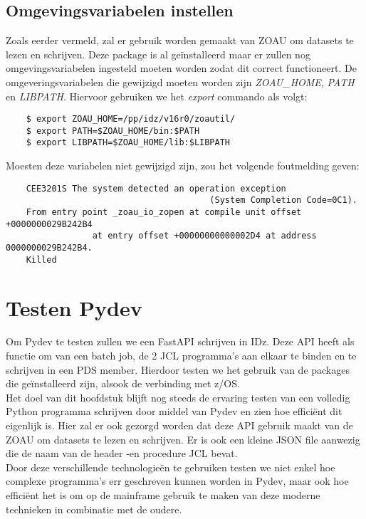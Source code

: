 \section{Omgevingsvariabelen instellen}
Zoals eerder vermeld, zal er gebruik worden gemaakt van ZOAU om datasets te lezen en schrijven. Deze package is al geïnstalleerd maar er zullen nog omgevingsvariabelen ingesteld moeten worden zodat dit correct functioneert. De omgeveringsvariabelen die gewijzigd moeten worden zijn \textit{ZOAU\_HOME}, \textit{PATH} en \textit{LIBPATH}. Hiervoor gebruiken we het \textit{export} commando als volgt: \\

\begin{lstlisting}
    $ export ZOAU_HOME=/pp/idz/v16r0/zoautil/
    $ export PATH=$ZOAU_HOME/bin:$PATH
    $ export LIBPATH=$ZOAU_HOME/lib:$LIBPATH
\end{lstlisting}

Moesten deze variabelen niet gewijzigd zijn, zou het volgende foutmelding geven:
\begin{lstlisting}
    CEE3201S The system detected an operation exception 
                                        (System Completion Code=0C1).
    From entry point _zoau_io_zopen at compile unit offset +0000000029B242B4 
                 at entry offset +00000000000002D4 at address 0000000029B242B4.
    Killed
\end{lstlisting}


\chapter{Testen Pydev}
\label{ch:test-pydev}

Om Pydev te testen zullen we een FastAPI schrijven in IDz. Deze API heeft als functie om van een batch job, de 2 JCL programma's aan elkaar te binden en te schrijven in een PDS member. Hierdoor testen we het gebruik van de packages die geïnstalleerd zijn, alsook de verbinding met z/OS. \\

Het doel van dit hoofdstuk blijft nog steeds de ervaring testen van een volledig Python programma schrijven door middel van Pydev en zien hoe efficiënt dit eigenlijk is. Hier zal er ook gezorgd worden dat deze API gebruik maakt van de ZOAU om datasets te lezen en schrijven. Er is ook een kleine JSON file aanwezig die de naam van de header -en procedure JCL bevat. \\

Door deze verschillende technologieën te gebruiken testen we niet enkel hoe complexe programma's err geschreven kunnen worden in Pydev, maar ook hoe efficiënt het is om op de mainframe gebruik te maken van deze moderne technieken in combinatie met de oudere.


